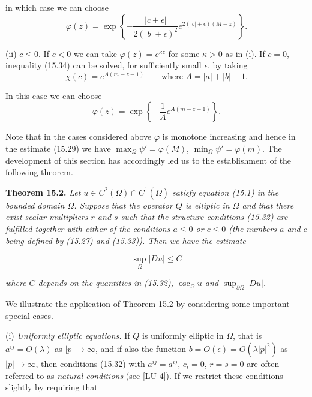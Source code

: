 
in which case we can choose
\[
\varphi(z)=\exp\left\{-\frac{|c+\epsilon|}{2(|b|+\epsilon)^2}e^{2(|b|+\epsilon)(M-z)}\right\}.
\]

(ii) $c\leq 0$. If $c<0$ we can take $\varphi(z)=e^{\kappa z}$ for some $\kappa>0$ as in (i). If $c=0$, inequality (15.34) can be solved, for sufficiently small $\epsilon$, by taking
\[
\chi(c)=e^{A(m-z-1)} \qquad \text{where } A=|a|+|b|+1.
\]

In this case we can choose
\[
\varphi(z)=\exp\left\{-\frac{1}{A}e^{A(m-z-1)}\right\}.
\]

Note that in the cases considered above $\varphi$ is monotone increasing and hence in the estimate (15.29) we have $\max_{\Omega}\psi'=\varphi(M)$, $\min_{\Omega}\psi'=\varphi(m)$.
The development of this section has accordingly led us to the establishment of
the following theorem.

\begin{theorem}[Theorem 15.2]\label{gt:thm-15-2}
\textbf{Theorem 15.2.} \textit{Let $u\in C^2(\Omega)\cap C^1(\bar{\Omega})$ satisfy equation (15.1) in the bounded domain $\Omega$. Suppose that the operator $Q$ is elliptic in $\Omega$ and that there exist scalar multipliers $r$ and $s$ such that the structure conditions (15.32) are fulfilled together with either of the conditions $a\leq 0$ or $c\leq 0$ (the numbers $a$ and $c$ being defined by (15.27) and (15.33)). Then we have the estimate}

\begin{equation}
\tag{15.35}
\sup_{\Omega} |Du| \leq C
\end{equation}

\textit{where $C$ depends on the quantities in (15.32), $\operatorname{osc}_{\Omega} u$ and $\sup_{\partial\Omega} |Du|$.}
\end{theorem}

We illustrate the application of Theorem 15.2 by considering some important special cases.

(i) \textit{Uniformly elliptic equations.} If $Q$ is uniformly elliptic in $\Omega$, that is $a^{ij}=O(\lambda)$ as $|p|\to\infty$, and if also the function $b=O(\epsilon)=O(\lambda|p|^2)$ as $|p|\to\infty$, then conditions (15.32) with $a^{ij}=a^{ij}$, $c_i=0$, $r=s=0$ are often referred to as \textit{natural conditions} (see [LU 4]). If we restrict these conditions slightly by requiring that

